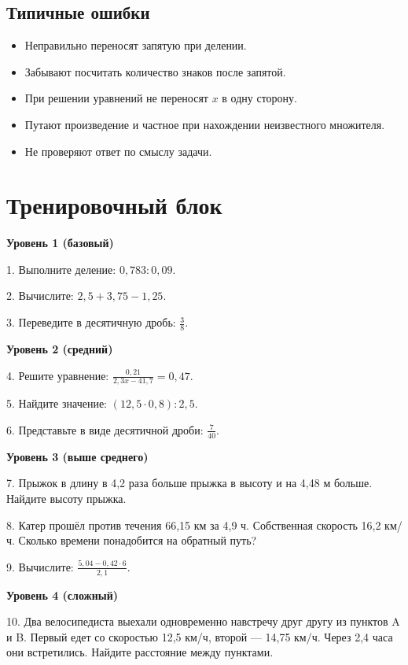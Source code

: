 \documentclass[a4paper,12pt]{article}
\begin{document}
\subsection*{Типичные ошибки}
\begin{itemize}[leftmargin=*]
\item[$\times$] Неправильно переносят запятую при делении.
\item[$\times$] Забывают посчитать количество знаков после запятой.
\item[$\times$] При решении уравнений не переносят $x$ в одну сторону.
\item[$\times$] Путают произведение и частное при нахождении неизвестного множителя.
\item[$\times$] Не проверяют ответ по смыслу задачи.
\end{itemize}

\newpage
\section*{Тренировочный блок}

\textbf{Уровень 1 (базовый)}

1. Выполните деление: $0{,}783 : 0{,}09$.

2. Вычислите: $2{,}5 + 3{,}75 - 1{,}25$.

3. Переведите в десятичную дробь: $\frac{3}{8}$.

\medskip
\textbf{Уровень 2 (средний)}

4. Решите уравнение: $\frac{0{,}21}{2{,}3x - 41{,}7} = 0{,}47$.

5. Найдите значение: $(12{,}5 \cdot 0{,}8) : 2{,}5$.

6. Представьте в виде десятичной дроби: $\frac{7}{40}$.

\medskip
\textbf{Уровень 3 (выше среднего)}

7. Прыжок в длину в 4{,}2 раза больше прыжка в высоту и на 4{,}48 м больше. Найдите высоту прыжка.

8. Катер прошёл против течения 66{,}15 км за 4{,}9 ч. Собственная скорость 16{,}2 км/ч. Сколько времени понадобится на обратный путь?

9. Вычислите: $\frac{5{,}04 - 0{,}42 \cdot 6}{2{,}1}$.

\medskip
\textbf{Уровень 4 (сложный)}

10. Два велосипедиста выехали одновременно навстречу друг другу из пунктов A и B. Первый едет со скоростью 12{,}5 км/ч, второй --- 14{,}75 км/ч. Через 2{,}4 часа они встретились. Найдите расстояние между пунктами.
\end{document}
